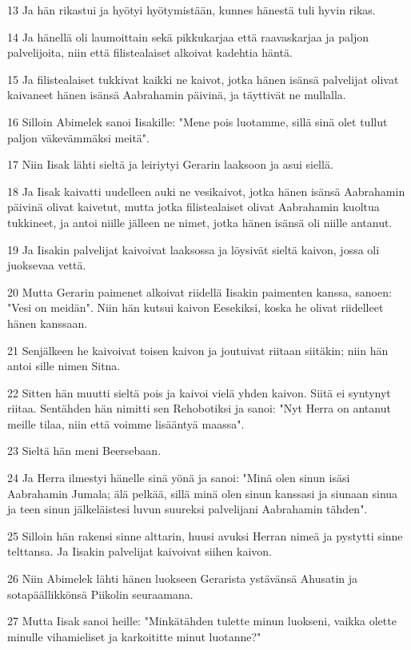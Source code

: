 \par 13 Ja hän rikastui ja hyötyi hyötymistään, kunnes hänestä tuli hyvin rikas.
\par 14 Ja hänellä oli laumoittain sekä pikkukarjaa että raavaskarjaa ja paljon palvelijoita, niin että filistealaiset alkoivat kadehtia häntä.
\par 15 Ja filistealaiset tukkivat kaikki ne kaivot, jotka hänen isänsä palvelijat olivat kaivaneet hänen isänsä Aabrahamin päivinä, ja täyttivät ne mullalla.
\par 16 Silloin Abimelek sanoi Iisakille: "Mene pois luotamme, sillä sinä olet tullut paljon väkevämmäksi meitä".
\par 17 Niin Iisak lähti sieltä ja leiriytyi Gerarin laaksoon ja asui siellä.
\par 18 Ja Iisak kaivatti uudelleen auki ne vesikaivot, jotka hänen isänsä Aabrahamin päivinä olivat kaivetut, mutta jotka filistealaiset olivat Aabrahamin kuoltua tukkineet, ja antoi niille jälleen ne nimet, jotka hänen isänsä oli niille antanut.
\par 19 Ja Iisakin palvelijat kaivoivat laaksossa ja löysivät sieltä kaivon, jossa oli juoksevaa vettä.
\par 20 Mutta Gerarin paimenet alkoivat riidellä Iisakin paimenten kanssa, sanoen: "Vesi on meidän". Niin hän kutsui kaivon Eesekiksi, koska he olivat riidelleet hänen kanssaan.
\par 21 Senjälkeen he kaivoivat toisen kaivon ja joutuivat riitaan siitäkin; niin hän antoi sille nimen Sitna.
\par 22 Sitten hän muutti sieltä pois ja kaivoi vielä yhden kaivon. Siitä ei syntynyt riitaa. Sentähden hän nimitti sen Rehobotiksi ja sanoi: "Nyt Herra on antanut meille tilaa, niin että voimme lisääntyä maassa".
\par 23 Sieltä hän meni Beersebaan.
\par 24 Ja Herra ilmestyi hänelle sinä yönä ja sanoi: "Minä olen sinun isäsi Aabrahamin Jumala; älä pelkää, sillä minä olen sinun kanssasi ja siunaan sinua ja teen sinun jälkeläistesi luvun suureksi palvelijani Aabrahamin tähden".
\par 25 Silloin hän rakensi sinne alttarin, huusi avuksi Herran nimeä ja pystytti sinne telttansa. Ja Iisakin palvelijat kaivoivat siihen kaivon.
\par 26 Niin Abimelek lähti hänen luokseen Gerarista ystävänsä Ahusatin ja sotapäällikkönsä Piikolin seuraamana.
\par 27 Mutta Iisak sanoi heille: "Minkätähden tulette minun luokseni, vaikka olette minulle vihamieliset ja karkoititte minut luotanne?"
